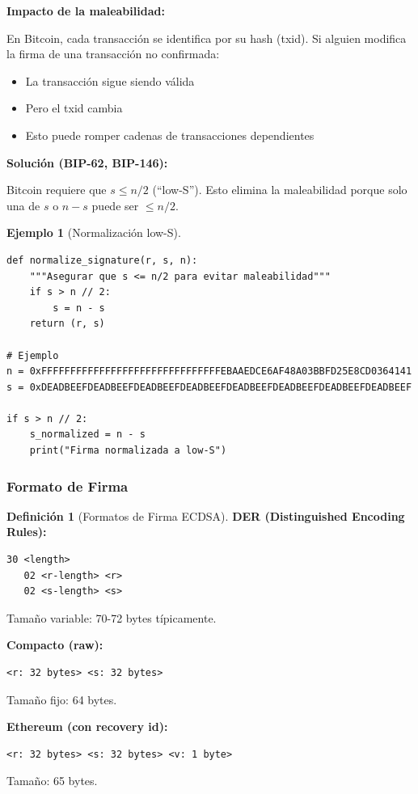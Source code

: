 \documentclass[11pt,a4paper,twoside,openright]{book}
\theoremstyle{definition}
\newtheorem{definition}{Definición}[chapter]
\newtheorem{example}{Ejemplo}[chapter]
\theoremstyle{plain}
\theoremstyle{remark}
\begin{document}
\begin{keyidea}
\textbf{Impacto de la maleabilidad:}

En Bitcoin, cada transacción se identifica por su hash (txid). Si alguien modifica la firma de una transacción no confirmada:
\begin{itemize}
    \item La transacción sigue siendo válida
    \item Pero el txid cambia
    \item Esto puede romper cadenas de transacciones dependientes
\end{itemize}

\textbf{Solución (BIP-62, BIP-146):}

Bitcoin requiere que $s \leq n/2$ (``low-S''). Esto elimina la maleabilidad porque solo una de $s$ o $n-s$ puede ser $\leq n/2$.
\end{keyidea}

\begin{example}[Normalización low-S]
\begin{verbatim}
def normalize_signature(r, s, n):
    """Asegurar que s <= n/2 para evitar maleabilidad"""
    if s > n // 2:
        s = n - s
    return (r, s)

# Ejemplo
n = 0xFFFFFFFFFFFFFFFFFFFFFFFFFFFFFFFEBAAEDCE6AF48A03BBFD25E8CD0364141
s = 0xDEADBEEFDEADBEEFDEADBEEFDEADBEEFDEADBEEFDEADBEEFDEADBEEFDEADBEEF

if s > n // 2:
    s_normalized = n - s
    print("Firma normalizada a low-S")
\end{verbatim}
\end{example}

\subsubsection{Formato de Firma}

\begin{definition}[Formatos de Firma ECDSA]
\textbf{DER (Distinguished Encoding Rules):}
\begin{verbatim}
30 <length>
   02 <r-length> <r>
   02 <s-length> <s>
\end{verbatim}
Tamaño variable: 70-72 bytes típicamente.

\textbf{Compacto (raw):}
\begin{verbatim}
<r: 32 bytes> <s: 32 bytes>
\end{verbatim}
Tamaño fijo: 64 bytes.

\textbf{Ethereum (con recovery id):}
\begin{verbatim}
<r: 32 bytes> <s: 32 bytes> <v: 1 byte>
\end{verbatim}
Tamaño: 65 bytes.
\end{definition}
\end{document}

